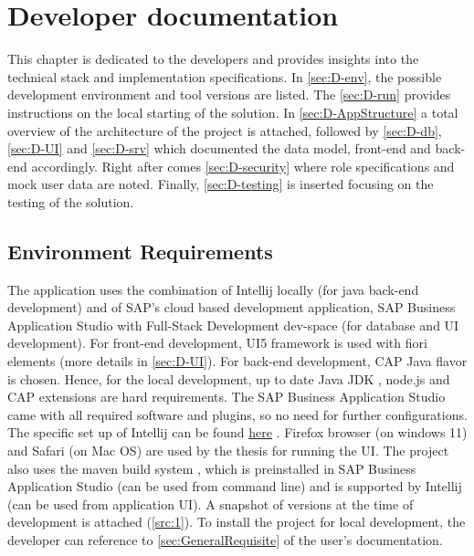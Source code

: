 \chapter{Developer documentation}
\label{ch:impl}

This chapter is dedicated to the developers and provides insights into the technical stack and implementation specifications. In \autoref{sec:D-env}, the possible development environment and tool versions are listed. The \autoref{sec:D-run} provides instructions on the local starting of the solution. In \autoref{sec:D-AppStructure} a total overview of the architecture of the project is attached, followed by \autoref{sec:D-db}, \autoref{sec:D-UI} and \autoref{sec:D-srv} which documented the data model, front-end and back-end accordingly. Right after comes \autoref{sec:D-security} where role specifications and mock user data are noted. Finally, \autoref{sec:D-testing} is inserted focusing on the testing of the solution. 

\section{Environment Requirements}
\label{sec:D-env}

The application uses the combination of Intellij \cite{intellij} locally (for java back-end development) and of SAP's cloud based development application, SAP Business Application Studio \cite{bas} with Full-Stack Development dev-space (for database and UI development).
For front-end development, UI5 framework \cite{ui5-toolkit} is used with fiori elements \cite{fiorielements} (more details in \ref{sec:D-UI}). 
For back-end development, CAP Java \cite{cap-about}\cite{cap-java} flavor is chosen.
Hence, for the local development, up to date Java JDK \cite{java}, node.js \cite{nodejs} and CAP extensions are hard requirements. 
The SAP Business Application Studio came with all required software and plugins, so no need for further configurations. The specific set up of Intellij can be found \href{https://github.com/SAP-samples/cloud-cap-samples-java\#using-intellij-idea-community-and-ultimate}{here} \cite{proj-setup-intellij}.
Firefox \cite{firefox} browser (on windows 11) and Safari \cite{safari} (on Mac OS) are used by the thesis for running the UI. The project also uses the maven build system \cite{maven}, which is preinstalled in SAP Business Application Studio (can be used from command line) and is supported by Intellij (can be used from application UI). 
A snapshot of versions at the time of development is attached (\autoref{src:1}). To install the project for local development, the developer can reference to \autoref{sec:GeneralRequisite} of the user's documentation.

